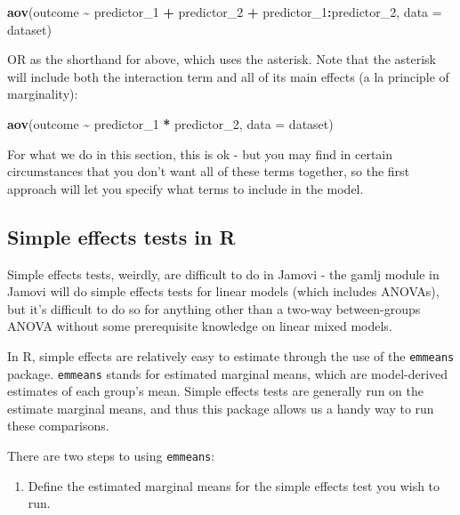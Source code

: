 \documentclass[
]{book}
\newenvironment{Shaded}{\begin{snugshade}}{\end{snugshade}}
\newcommand{\AttributeTok}[1]{\textcolor[rgb]{0.13,0.29,0.53}{#1}}
\newcommand{\FunctionTok}[1]{\textcolor[rgb]{0.13,0.29,0.53}{\textbf{#1}}}
\newcommand{\NormalTok}[1]{#1}
\newcommand{\SpecialCharTok}[1]{\textcolor[rgb]{0.81,0.36,0.00}{\textbf{#1}}}
\providecommand{\tightlist}{%
  \setlength{\itemsep}{0pt}\setlength{\parskip}{0pt}}
\begin{document}
\begin{Shaded}
\begin{Highlighting}[]
\FunctionTok{aov}\NormalTok{(outcome }\SpecialCharTok{\textasciitilde{}}\NormalTok{ predictor\_1 }\SpecialCharTok{+}\NormalTok{ predictor\_2 }\SpecialCharTok{+}\NormalTok{ predictor\_1}\SpecialCharTok{:}\NormalTok{predictor\_2, }\AttributeTok{data =}\NormalTok{ dataset)}
\end{Highlighting}
\end{Shaded}

OR as the shorthand for above, which uses the asterisk. Note that the asterisk will include both the interaction term and all of its main effects (a la principle of marginality):

\begin{Shaded}
\begin{Highlighting}[]
\FunctionTok{aov}\NormalTok{(outcome }\SpecialCharTok{\textasciitilde{}}\NormalTok{ predictor\_1 }\SpecialCharTok{*}\NormalTok{ predictor\_2, }\AttributeTok{data =}\NormalTok{ dataset)}
\end{Highlighting}
\end{Shaded}

For what we do in this section, this is ok - but you may find in certain circumstances that you don't want all of these terms together, so the first approach will let you specify what terms to include in the model.

\subsection{Simple effects tests in R}\label{simple-effects-tests-in-r}

Simple effects tests, weirdly, are difficult to do in Jamovi - the gamlj module in Jamovi will do simple effects tests for linear models (which includes ANOVAs), but it's difficult to do so for anything other than a two-way between-groups ANOVA without some prerequisite knowledge on linear mixed models.

In R, simple effects are relatively easy to estimate through the use of the \texttt{emmeans} package. \texttt{emmeans} stands for estimated marginal means, which are model-derived estimates of each group's mean. Simple effects tests are generally run on the estimate marginal means, and thus this package allows us a handy way to run these comparisons.

There are two steps to using \texttt{emmeans}:

\begin{enumerate}
\def\labelenumi{\arabic{enumi}.}
\tightlist
\item
  Define the estimated marginal means for the simple effects test you wish to run.
\end{enumerate}
\end{document}

